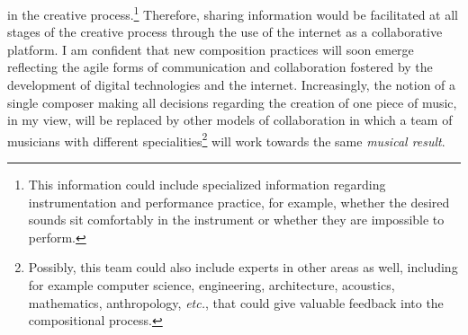 in the creative process.\footnote{This information could include specialized information regarding instrumentation and performance practice, for example, whether the desired sounds sit comfortably in the instrument or whether they are impossible to perform.} Therefore, sharing information would be facilitated at all stages of the creative process through the use of the internet as a collaborative platform. I am confident that new composition practices will soon emerge reflecting the agile forms of communication and collaboration fostered by the development of digital technologies and the internet. Increasingly, the notion of a single composer making all decisions regarding the creation of one piece of music, in my view, will be replaced by other models of collaboration in which a team of musicians with different specialities\footnote{Possibly, this team could also include experts in other areas as well, including for example computer science, engineering, architecture, acoustics, mathematics, anthropology, \emph{etc.}, that could give valuable feedback into the compositional process.} will work towards the same \emph{musical result}.


\label{ch:strategies}